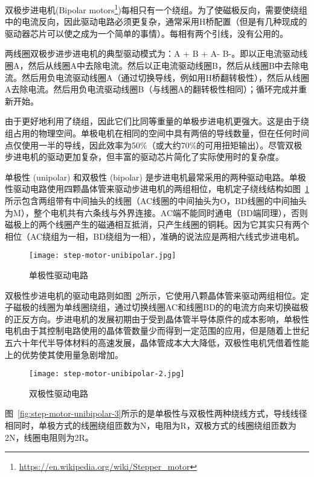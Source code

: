 双极步进电机(Bipolar motors\footnote{\url{https://en.wikipedia.org/wiki/Stepper_motor}})每相只有一个绕组。为了使磁极反向，需要使绕组中的电流反向，因此驱动电路必须更复杂，通常采用H桥配置（但是有几种现成的驱动器芯片可以使之成为一个简单的事情）。每相有两个引线，没有公用的。

两线圈双极步进步进电机的典型驱动模式为：A + B + A- B-。即以正电流驱动线圈A，然后从线圈A中去除电流。然后以正电流驱动线圈B，然后从线圈B中去除电流。然后用负电流驱动线圈A（通过切换导线，例如用H桥翻转极性），然后从线圈A去除电流。然后用负电流驱动线圈B（与线圈A的翻转极性相同）；循环完成并重新开始。

由于更好地利用了绕组，因此它们比同等重量的单极步进电机更强大。这是由于绕组占用的物理空间。单极电机在相同的空间中具有两倍的导线数量，但在任何时间点仅使用一半的导线，因此效率为50\%（或大约70\%的可用扭矩输出）。尽管双极步进电机的驱动更加复杂，但丰富的驱动芯片简化了实际使用时的复杂度。

单极性 (unipolar) 和双极性 (bipolar) 是步进电机最常采用的两种驱动电路。单极性驱动电路使用四颗晶体管来驱动步进电机的两组相位，电机定子绕线结构如图~\ref{fig:step-motor-unibipolar}所示包含两组带有中间抽头的线圈（AC线圈的中间抽头为O，BD线圈的中间抽头为M），整个电机共有六条线与外界连接。AC端不能同时通电（BD端同理），否则磁极上的两个线圈产生的磁通相互抵消，只产生线圈的铜耗。因为它其实只有两个相位（AC绕组为一相，BD绕组为一相），准确的说法应是两相六线式步进电机。

\begin{figure}[htbp]
    \centering
    \texttt{[image: step-motor-unibipolar.jpg]}
    \caption{单极性驱动电路}
    \label{fig:step-motor-unibipolar}
\end{figure}

双极性步进电机的驱动电路则如图~\ref{fig:step-motor-unibipolar-2}所示，它使用八颗晶体管来驱动两组相位。定子磁极的线圈为单线圈绕组，通过切换线圈AC和线圈BD的的电流方向来切换磁极的正反方向。步进电机的发展初期由于受到晶体管半导体原件的成本影响，单极性电机由于其控制电路使用的晶体管数量少而得到一定范围的应用，但是随着上世纪五六十年代半导体材料的高速发展，晶体管成本大大降低，双极性电机凭借着性能上的优势使其使用量急剧增加。

\begin{figure}[htbp]
    \centering
    \texttt{[image: step-motor-unibipolar-2.jpg]}
    \caption{双极性驱动电路}
    \label{fig:step-motor-unibipolar-2}
\end{figure}

图~\ref{fig:step-motor-unibipolar-3}所示的是单极性与双极性两种绕线方式，导线线径相同时，单极方式的线圈绕组匝数为N，电阻为R，双极方式的线圈绕组匝数为2N，线圈电阻则为2R。

